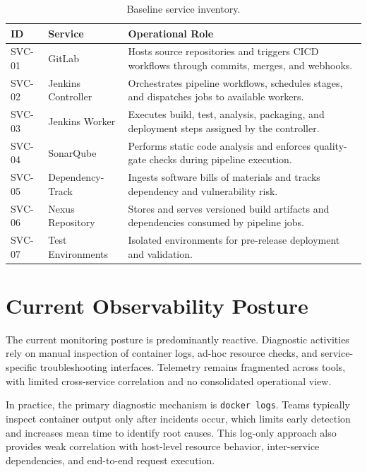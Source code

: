 \begin{table}[htbp]
    \centering
    \caption{Baseline service inventory.}
    \label{tab:baseline-service-inventory}
    \begin{tabular}{|p{}|p{}|p{}|}
        \hline
        \textbf{ID} & \textbf{Service} & \textbf{Operational Role} \\
        \hline
        SVC-01 & GitLab & Hosts source repositories and triggers \ac{CICD} workflows through commits, merges, and webhooks. \\
        \hline
        SVC-02 & Jenkins Controller & Orchestrates pipeline workflows, schedules stages, and dispatches jobs to available workers. \\
        \hline
        SVC-03 & Jenkins Worker & Executes build, test, analysis, packaging, and deployment steps assigned by the controller. \\
        \hline
        SVC-04 & SonarQube & Performs static code analysis and enforces quality-gate checks during pipeline execution. \\
        \hline
        SVC-05 & Dependency-Track & Ingests software bills of materials and tracks dependency and vulnerability risk. \\
        \hline
        SVC-06 & Nexus Repository & Stores and serves versioned build artifacts and dependencies consumed by pipeline jobs. \\
        \hline
        SVC-07 & Test Environments & Isolated environments for pre-release deployment and validation. \\
        \hline
    \end{tabular}
\end{table}


\section{Current Observability Posture}

The current monitoring posture is predominantly reactive. Diagnostic activities rely on manual inspection of container logs, ad-hoc resource checks, and service-specific troubleshooting interfaces. Telemetry remains fragmented across tools, with limited cross-service correlation and no consolidated operational view.

In practice, the primary diagnostic mechanism is \texttt{docker logs}. Teams typically inspect container output only after incidents occur, which limits early detection and increases mean time to identify root causes. This log-only approach also provides weak correlation with host-level resource behavior, inter-service dependencies, and end-to-end request execution.

